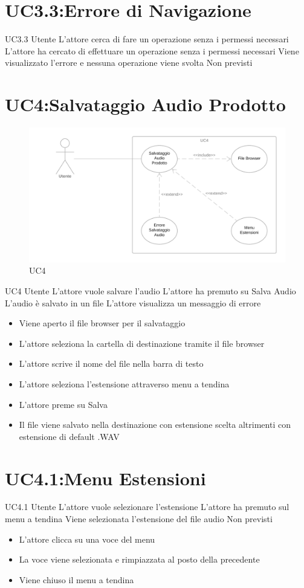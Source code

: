 \documentclass[../AnalisideiRequisiti.tex]{subfiles}
\begin{document}
\section{UC3.3:Errore di Navigazione}
\UserCase
{UC3.3}
{Utente}
{}
{L'attore cerca di fare un operazione senza i permessi necessari}
{L'attore ha cercato di effettuare un operazione senza i permessi necessari}
{Viene visualizzato l'errore e nessuna operazione viene svolta}
{Non previsti}
{}

\section{UC4:Salvataggio Audio Prodotto}
\begin{figure}[H]
	\caption{UC4}
	\centering
	\includegraphics[width=\textwidth]{../img/UC04.png}
\end{figure}
\UserCase
{UC4}
{Utente}
{}
{L'attore vuole salvare l'audio}
{L'attore ha premuto su Salva Audio}
{L'audio è salvato in un file}
{L'attore visualizza un messaggio di errore }
{
		\begin{itemize}
		\item{} Viene aperto il file browser per il salvataggio
		\item{} L'attore seleziona la cartella di destinazione tramite il file browser 
		\item{} L'attore scrive il nome del file nella barra di testo
		\item{} L'attore seleziona l'estensione attraverso menu a tendina 
		\item{} L'attore preme su Salva 
		\item{} Il file viene salvato nella destinazione con estensione scelta altrimenti con estensione di default .WAV
\end{itemize}
}
\section{UC4.1:Menu Estensioni}
\UserCase
{UC4.1}
{Utente}
{}
{L'attore vuole selezionare l'estensione}
{L'attore ha premuto sul menu a tendina}
{Viene selezionata l'estensione del file audio}
{Non previsti}
{
\begin{itemize}
	\item{} L'attore clicca su una voce del menu
	\item{} La voce viene selezionata e rimpiazzata al posto della precedente
	\item{} Viene chiuso il menu a tendina

\end{itemize}
}		
\end{document}

